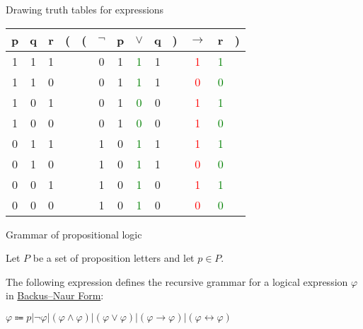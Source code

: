 \documentclass[
  ignorenonframetext,
]{beamer}
\begin{document}
\begin{frame}{Drawing truth tables for expressions}
\protect\hypertarget{drawing-truth-tables-for-expressions-3}{}

\begin{tabular}{@{ }c@{ }@{ }c@{ }@{ }c | c@{}@{}c@{}@{ }c@{ }@{ }c@{ }@{ }c@{ }@{ }c@{ }@{}c@{}@{ }c@{ }@{ }c@{ }@{}c@{ }}
p & q & r & ( & ( & $\neg$ & p & $\vee$ & q & ) & $\rightarrow$ & r & )\\
\hline 
1 & 1 & 1 &  &  & 0 & 1 & \textcolor{green}{1} & 1 &  & \textcolor{red}{1} & \textcolor{green}{1} & \\
1 & 1 & 0 &  &  & 0 & 1 & \textcolor{green}{1} & 1 &  & \textcolor{red}{0} & \textcolor{green}{0} & \\
1 & 0 & 1 &  &  & 0 & 1 & \textcolor{green}{0} & 0 &  & \textcolor{red}{1} & \textcolor{green}{1} & \\
1 & 0 & 0 &  &  & 0 & 1 & \textcolor{green}{0} & 0 &  & \textcolor{red}{1} & \textcolor{green}{0} & \\
0 & 1 & 1 &  &  & 1 & 0 & \textcolor{green}{1} & 1 &  & \textcolor{red}{1} & \textcolor{green}{1} & \\
0 & 1 & 0 &  &  & 1 & 0 & \textcolor{green}{1} & 1 &  & \textcolor{red}{0} & \textcolor{green}{0} & \\
0 & 0 & 1 &  &  & 1 & 0 & \textcolor{green}{1} & 0 &  & \textcolor{red}{1} & \textcolor{green}{1} & \\
0 & 0 & 0 &  &  & 1 & 0 & \textcolor{green}{1} & 0 &  & \textcolor{red}{0} & \textcolor{green}{0} & \\
\end{tabular}

\end{frame}

\begin{frame}{Grammar of propositional logic}
\protect\hypertarget{grammar-of-propositional-logic}{}

Let \(P\) be a set of proposition letters and let \(p \in P\).

The following expression defines the recursive grammar for a logical
expression \(\varphi\) in
\href{https://en.wikipedia.org/wiki/Backus\%E2\%80\%93Naur_Form}{Backus--Naur
Form}:

\(\varphi \Coloneqq p|\neg\varphi|(\varphi \wedge \varphi)|(\varphi \vee \varphi)|(\varphi \rightarrow \varphi)|(\varphi \leftrightarrow \varphi)\)

\end{frame}
\end{document}
